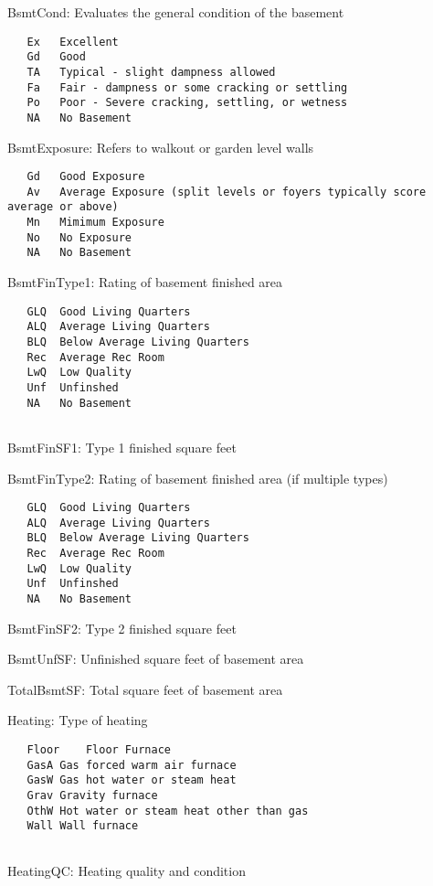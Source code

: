 \documentclass[]{article}
\begin{document}
BsmtCond: Evaluates the general condition of the basement

\begin{verbatim}
   Ex   Excellent
   Gd   Good
   TA   Typical - slight dampness allowed
   Fa   Fair - dampness or some cracking or settling
   Po   Poor - Severe cracking, settling, or wetness
   NA   No Basement
\end{verbatim}

BsmtExposure: Refers to walkout or garden level walls

\begin{verbatim}
   Gd   Good Exposure
   Av   Average Exposure (split levels or foyers typically score average or above)  
   Mn   Mimimum Exposure
   No   No Exposure
   NA   No Basement
\end{verbatim}

BsmtFinType1: Rating of basement finished area

\begin{verbatim}
   GLQ  Good Living Quarters
   ALQ  Average Living Quarters
   BLQ  Below Average Living Quarters   
   Rec  Average Rec Room
   LwQ  Low Quality
   Unf  Unfinshed
   NA   No Basement
    
\end{verbatim}

BsmtFinSF1: Type 1 finished square feet

BsmtFinType2: Rating of basement finished area (if multiple types)

\begin{verbatim}
   GLQ  Good Living Quarters
   ALQ  Average Living Quarters
   BLQ  Below Average Living Quarters   
   Rec  Average Rec Room
   LwQ  Low Quality
   Unf  Unfinshed
   NA   No Basement
\end{verbatim}

BsmtFinSF2: Type 2 finished square feet

BsmtUnfSF: Unfinished square feet of basement area

TotalBsmtSF: Total square feet of basement area

Heating: Type of heating

\begin{verbatim}
   Floor    Floor Furnace
   GasA Gas forced warm air furnace
   GasW Gas hot water or steam heat
   Grav Gravity furnace 
   OthW Hot water or steam heat other than gas
   Wall Wall furnace
    
\end{verbatim}

HeatingQC: Heating quality and condition
\end{document}
